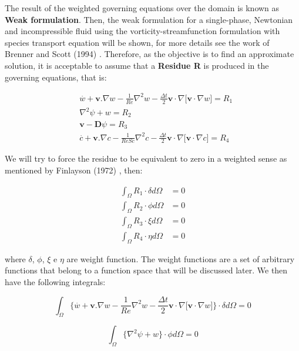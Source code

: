 The result of the weighted governing equations over the domain 
is known as \textbf{Weak formulation}.
Then, the weak formulation 
for a single-phase, Newtonian and incompressible fluid using 
the vorticity-streamfunction formulation with species transport equation
will be shown, for more details see the work of Brenner and Scott (1994) 
\cite{brenner1994}. 
Therefore, as the objective is to find an approximate solution, 
it is acceptable to assume that a \textbf{Residue R} 
is produced in the governing equations, that is:


\begin{align}
& \overset{.}{w} + \textbf{v}.\nabla w - \frac{1}{Re} \nabla^2 w 
 - \frac{\Delta t}{2} \textbf{v} \cdot \nabla \big[ \textbf{v} \cdot \nabla w \big]
 = R_1 \\[10pt]
& \nabla^2 \psi + w
 = R_2 \\[10pt]
& \textbf{v} - \textbf{D}\psi
 = R_3 \\[10pt]
& \overset{.}{c} + \textbf{v}.\nabla c - \frac{1}{ReSc} \nabla^2 c
 - \frac{\Delta t}{2} \textbf{v} \cdot \nabla \big[ \textbf{v} \cdot \nabla c \big]
 = R_4
\end{align}

We will try to force the residue to be equivalent to zero 
in a weighted sense as mentioned by Finlayson (1972) \cite{finlayson1972}, then:

\begin{align}
 \int_{\Omega} R_1 \cdot \delta d\Omega &= 0 \\
 \int_{\Omega} R_2 \cdot \phi d\Omega &= 0 \\
 \int_{\Omega} R_3 \cdot \xi d\Omega &= 0 \\
 \int_{\Omega} R_4 \cdot \eta d\Omega &= 0
\end{align}



\noindent
where $\delta$, $\phi$, $\xi$ e $\eta$ are weight function.
The weight functions are a set of arbitrary functions 
that belong to a function space that will be discussed later. 
We then have the following integrals:

\begin{equation}
 \int_{\Omega} \Bigg\{ 
 \overset{.}{w} + \textbf{v}.\nabla w 
 - \frac{1}{\textit{Re}} \nabla^2 w 
 - \frac{\Delta t}{2} \textbf{v} \cdot \nabla \big[ \textbf{v} \cdot \nabla w \big]
\Bigg\} \cdot \delta d\Omega = 0
\end{equation}

\begin{equation}
 \int_{\Omega} \big\{ \nabla^2 \psi + w \big\} \cdot \phi d\Omega = 0
\end{equation}

